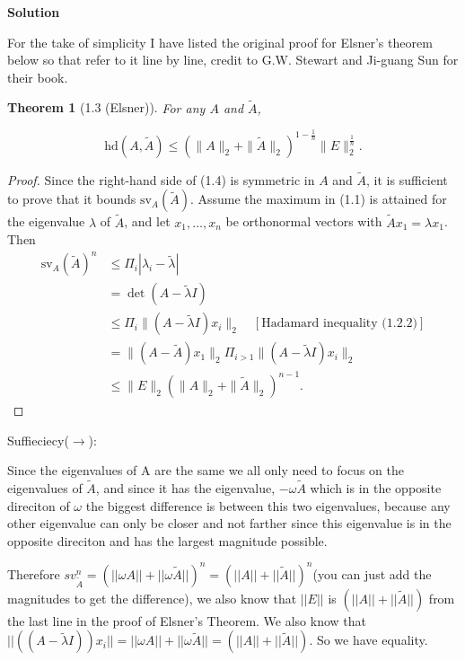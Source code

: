 \documentclass[11pt]{article}
\newtheorem{theorem}{Theorem}
\newcommand\red[1]{\marginpar{\linespread{.85}\sf%
		   \vspace{-1.4ex}\footnotesize{\color{red}#1}}}
\newcommand\0{\mathbf{0}}
\newcommand\<{\langle}
\renewcommand\>{\rangle}
\begin{document}
\begin{enumerate}
\textbf{Solution}

For the take of simplicity I have listed the original proof for Elsner's theorem below so that refer to it line by line, credit to G.W. Stewart and Ji-guang Sun for their book.

\begin{theorem}[1.3 (Elsner)]
For any \( A \) and \( \tilde{A} \),

\[
\text{hd}(A, \tilde{A}) \leq (\|A\|_2 + \|\tilde{A}\|_2)^{1 - \frac{1}{n}} \|E\|_{2}^{\frac{1}{n}}.
\]
\end{theorem}

\begin{proof}
Since the right-hand side of (1.4) is symmetric in \( A \) and \(
\tilde{A} \), it is sufficient to prove that it bounds \(
\text{sv}_A(\tilde{A}) \). Assume the maximum in (1.1) is attained for
the eigenvalue \( \lambda \) of \( \tilde{A} \), and let \( x_1,
\ldots, x_n \) be orthonormal vectors with \( \tilde{A}x_1 = \lambda
x_1 \). Then
\[
\begin{aligned}
\text{sv}_A(\tilde{A})^n &\leq \Pi_i |\lambda_i - \tilde{\lambda}| \\
&= \det(A - \tilde{\lambda}I) \\
&\leq \Pi_i \|(A - \tilde{\lambda}I)x_i\|_2 \quad [\text{Hadamard inequality (1.2.2)}] \\
&= \|(A - \tilde{A})x_1\|_2 \Pi_{i>1} \|(A - \tilde{\lambda}I)x_i\|_2 \\
&\leq \|E\|_2 (\|A\|_2 + \|\tilde{A}\|_2)^{n-1}.
\end{aligned}
\]
\end{proof}

Suffieciecy($\rightarrow$):

Since the eigenvalues of A are the same we all only need to focus on
the eigenvalues of $\tilde A$, and since it has the eigenvalue,
$-\omega \tilde A$ which is in the opposite direciton of $\omega$ the
biggest difference is between this two eigenvalues, because any other
eigenvalue can only be closer and not farther since this eigenvalue is
in the opposite direciton and has the largest magnitude possible.
\red{\checkmark}

Therefore $sv_{\tilde A}^{n}=( ||\omega A|| + || \omega \tilde A||)^{n} = ( || A|| + || \tilde A||)^{n} $(you can just add the magnitudes to get the difference), we also know that $||E||$ is $ ( || A|| + || \tilde A||)$ from the last line in the 
proof of Elsner's Theorem. We also know that $||((A - \tilde \lambda I))x_{i}||=|| \omega A|| +  || \omega \tilde A||=( || A|| + || \tilde A||)$. So we have equality.


\end{enumerate}
\end{document}
